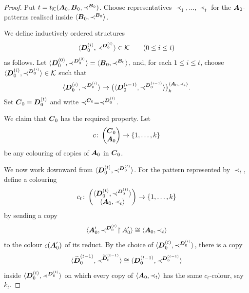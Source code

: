 \begin{proof}
    Put \(t=t_{\mathcal{K}}(\boldsymbol{A}_0,\boldsymbol{B}_0,\prec^{\boldsymbol{B}_0})\). Choose representatives \(\prec_1,\dots,\prec_t\) for the \(\boldsymbol{A}_0\)-patterns realised inside \(\langle\boldsymbol{B}_0,\prec^{\boldsymbol{B}_0}\rangle\).

    We define inductively ordered structures
    \[
        \langle\boldsymbol{D}_0^{(i)},\prec^{\boldsymbol{D}_0^{(i)}}\rangle\in\mathcal{K}
        \qquad (0\leq i\leq t)
    \]
    as follows. Let
    \(\langle\boldsymbol{D}_0^{(0)},\prec^{\boldsymbol{D}_0^{(0)}}\rangle
      =\langle\boldsymbol{B}_0,\prec^{\boldsymbol{B}_0}\rangle\), and, for each
    \(1\leq i\leq t\), choose
    \(\langle\boldsymbol{D}_0^{(i)},\prec^{\boldsymbol{D}_0^{(i)}}\rangle\in\mathcal{K}\)
    such that
    \[
        \langle\boldsymbol{D}_0^{(i)},\prec^{\boldsymbol{D}_0^{(i)}}\rangle\to
        \bigl(\langle\boldsymbol{D}_0^{(i-1)},\prec^{\boldsymbol{D}_0^{(i-1)}}\rangle\bigr)^{\langle\boldsymbol{A}_0,\prec_i\rangle}_{k}.
    \]
    Set \(\boldsymbol{C}_0=\boldsymbol{D}_0^{(t)}\) and write
    \(\prec^{\boldsymbol{C}_0}=\prec^{\boldsymbol{D}_0^{(t)}}\).

    We claim that \(\boldsymbol{C}_0\) has the required property. Let
    \[
        c\colon\begin{pmatrix}\boldsymbol{C}_0\\ \boldsymbol{A}_0\end{pmatrix}\to\{1,\dots,k\}
    \]
    be any colouring of copies of \(\boldsymbol{A}_0\) in \(\boldsymbol{C}_0\).

    We now work downward from
    \(\langle\boldsymbol{D}_0^{(t)},\prec^{\boldsymbol{D}_0^{(t)}}\rangle\). For the pattern
    represented by \(\prec_t\), define a colouring
    \[
        c_t\colon
        \begin{pmatrix}
            \langle\boldsymbol{D}_0^{(t)},\prec^{\boldsymbol{D}_0^{(t)}}\rangle \\
            \langle\boldsymbol{A}_0,\prec_t\rangle
        \end{pmatrix}
        \to
        \{1,\dots,k\}
    \]
    by sending a copy
    \[
        \langle\boldsymbol{A}_0',\prec^{\boldsymbol{D}_0^{(t)}}\restriction A_0'\rangle\cong\langle\boldsymbol{A}_0,\prec_t\rangle
    \]
    to the colour \(c(\boldsymbol{A}_0')\) of its reduct. By the choice of
    \(\langle\boldsymbol{D}_0^{(t)},\prec^{\boldsymbol{D}_0^{(t)}}\rangle\), there is a copy
    \[
        \langle\widetilde{\boldsymbol{D}}_0^{(t-1)},
        \prec^{\widetilde{\boldsymbol{D}}_0^{(t-1)}}\rangle\cong
        \langle\boldsymbol{D}_0^{(t-1)},\prec^{\boldsymbol{D}_0^{(t-1)}}\rangle
    \]
    inside \(\langle\boldsymbol{D}_0^{(t)},\prec^{\boldsymbol{D}_0^{(t)}}\rangle\) on which every
    copy of \(\langle\boldsymbol{A}_0,\prec_t\rangle\) has the same \(c_t\)-colour,
    say \(k_t\).


\end{proof}
